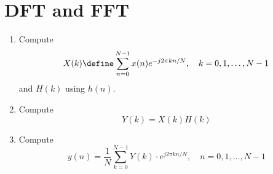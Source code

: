 \documentclass[journal, 12pt, twocolumn]{IEEEtran}
\renewcommand\thesection{\arabic{section}}
\begin{document}
\section{DFT and FFT}
\begin{enumerate}[label=\thesection.\arabic*]
	\item
	      Compute
	      \begin{equation}
		      X(k) \define \sum _{n=0}^{N-1}x(n) e^{-j2\pi kn/N}, \quad k = 0,1,\dots, N-1
	      \end{equation}
	      and $H(k)$ using $h(n)$.
	\item Compute
	      \begin{equation}
		      Y(k) = X(k)H(k)
		      \label{eq:fp}
	      \end{equation}
	\item Compute
	      \begin{equation}
		      y(n)={\frac {1}{N}}\sum _{k=0}^{N-1}Y(k)\cdot e^{j 2\pi kn/N},\quad n = 0,1,\dots, N-1
		      \label{eq:inv-ft}
	      \end{equation}


\end{enumerate}
\end{document}
